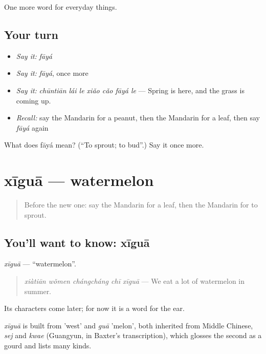 \begin{grammarlens}[title={What you've built}]
One more word for everyday things.
\end{grammarlens}

\subsection*{Your turn}
\begin{itemize}
\raggedright
  \item \emph{Say it:} \emph{fāyá}
  \item \emph{Say it:} \emph{fāyá}, once more
  \item \emph{Say it:} \emph{chūntiān lái le xiǎo cǎo fāyá le} — Spring is here, and the grass is coming up.
  \item \emph{Recall:} say the Mandarin for a peanut, then the Mandarin for a leaf, then say \emph{fāyá} again
\end{itemize}

\begin{tcolorbox}[breakable,colback=teal!4,colframe=teal!35!black,title={Before you move on}]
What does fāyá mean? (\textquotedblleft{}To sprout; to bud\textquotedblright{}.) Say it once more.
\end{tcolorbox}
\section[xīguā]{xīguā — watermelon}

\label{lesson:ZH-C237-xigua}



\begin{quote}
Before the new one: say the Mandarin for a leaf, then the Mandarin for to sprout.
\end{quote}

\subsection*{You'll want to know: xīguā}
\emph{xīguā} — \textquotedblleft{}watermelon\textquotedblright{}.

\begin{quote}
\emph{xiàtiān wǒmen chángcháng chī xīguā} — We eat a lot of watermelon in summer.
\end{quote}

Its characters come later; for now it is a word for the ear.

\begin{cousinweb}
\emph{xīguā} is built from  'west' and \emph{guā} 'melon', both inherited from Middle Chinese, \emph{sej} and \emph{kwae} (Guangyun, in Baxter's transcription), which glosses the second as a gourd and lists many kinds.
\end{cousinweb}


